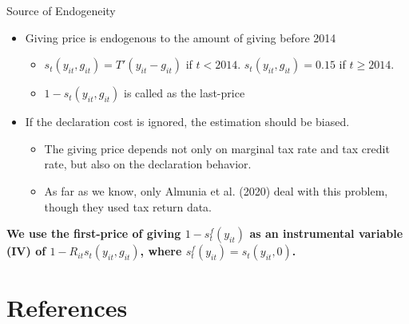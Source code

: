 \documentclass[
  ignorenonframetext,
  aspectratio=169,
]{beamer}
\providecommand{\tightlist}{%
  \setlength{\itemsep}{0pt}\setlength{\parskip}{0pt}}
\begin{document}
\begin{frame}{Source of Endogeneity}
\protect\hypertarget{source-of-endogeneity}{}
\begin{itemize}
\tightlist
\item
  Giving price is endogenous to the amount of giving before 2014

  \begin{itemize}
  \tightlist
  \item
    \(s_t(y_{it}, g_{it}) = T'(y_{it} - g_{it})\) if \(t < 2014\). \(s_t(y_{it}, g_{it}) = 0.15\) if \(t \ge 2014\).
  \item
    \(1 - s_t(y_{it}, g_{it})\) is called as the last-price
  \end{itemize}
\item
  If the declaration cost is ignored, the estimation should be biased.

  \begin{itemize}
  \tightlist
  \item
    The giving price depends not only on marginal tax rate and tax credit rate, but also on the declaration behavior.
  \item
    As far as we know, only Almunia et al. (2020) deal with this problem, though they used tax return data.
  \end{itemize}
\end{itemize}

\textbf{We use the first-price of giving \(1 - s^f_t(y_{it})\) as an instrumental variable (IV) of \(1 - R_{it}s_t(y_{it}, g_{it})\), where \(s^f_t(y_{it}) = s_t(y_{it}, 0)\).}
\end{frame}

\hypertarget{references}{%
\section*{References}\label{references}}
\end{document}
